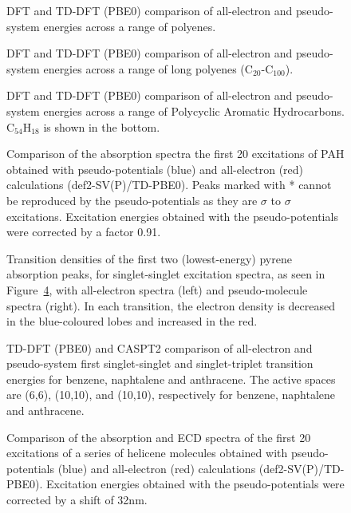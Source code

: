 \documentclass[12pt]{article}
\begin{document}
\begin{figure}
\caption{DFT and TD-DFT (PBE0) comparison of all-electron and pseudo-system energies across a range of
polyenes.}
\label{fig:alkenes_hf_dft}
\end{figure}

\begin{figure}
\caption{DFT and TD-DFT (PBE0) comparison of all-electron and pseudo-system energies across a range of long polyenes (C\(_{20}\)-C\(_{100}\)).}
\label{fig:long_chain_graphs}
\end{figure}

\begin{figure}
\caption{DFT and TD-DFT (PBE0) comparison of all-electron and pseudo-system energies across a range of Polycyclic Aromatic Hydrocarbons. 
C\(_{54}\)H\(_{18}\) is shown in the bottom.}
\label{fig:rings_graphs}
\end{figure}

\begin{figure}
\caption{Comparison of the absorption spectra the first 20 excitations of PAH obtained with
pseudo-potentials (blue) and all-electron (red) calculations (def2-SV(P)/TD-PBE0). Peaks marked
with * cannot be reproduced by the pseudo-potentials as they are $\sigma$ to $\sigma$ excitations.
Excitation energies obtained with the pseudo-potentials were corrected by a factor 0.91.}
\label{fig:cnhn_uv}
\end{figure}

\begin{figure}
\caption{Transition densities of the first two (lowest-energy) pyrene absorption peaks, for singlet-singlet excitation spectra, as seen in Figure~\ref{fig:cnhn_uv}, with all-electron spectra (left) and pseudo-molecule spectra (right). In each transition, the electron density is decreased in the blue-coloured lobes and increased in the red.}
\label{fig:transitiondensities}
\end{figure}

\begin{figure}
\caption{TD-DFT (PBE0) and CASPT2 comparison of all-electron and pseudo-system first singlet-singlet and
singlet-triplet transition energies for benzene, naphtalene and anthracene. The active spaces are 
(6,6), (10,10), and (10,10), respectively for benzene, naphtalene and anthracene.}
\label{fig:caspt2}
\end{figure}

\begin{figure}
\caption{Comparison of the absorption and ECD spectra of the first 20 excitations of a series of helicene molecules obtained with pseudo-potentials (blue) and all-electron (red) calculations (def2-SV(P)/TD-PBE0). 
Excitation energies obtained with the pseudo-potentials were corrected by a shift of 32nm.}
\label{fig:helicene_spectra}
\end{figure}
\end{document}
